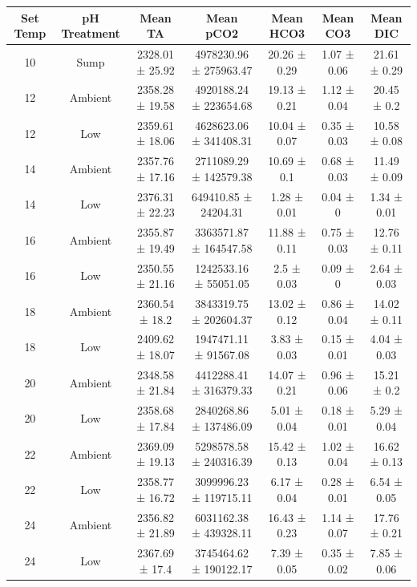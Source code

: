 \documentclass[
]{article}
\begin{document}
\begin{table}[!ht]
    \centering
    \begin{tabular}{|c|c|c|c|c|c|c|}
    \hline
        \textbf{Set Temp} & \textbf{pH Treatment} & \textbf{Mean TA} & \textbf{Mean pCO2} & \textbf{Mean HCO3} & \textbf{Mean CO3} & \textbf{Mean DIC} \\ \hline
        10 & Sump & 2328.01 ± 25.92 & 4978230.96 ± 275963.47 & 20.26 ± 0.29 & 1.07 ± 0.06 & 21.61 ± 0.29 \\ \hline
        12 & Ambient & 2358.28 ± 19.58 & 4920188.24 ± 223654.68 & 19.13 ± 0.21 & 1.12 ± 0.04 & 20.45 ± 0.2 \\ \hline
        12 & Low & 2359.61 ± 18.06 & 4628623.06 ± 341408.31 & 10.04 ± 0.07 & 0.35 ± 0.03 & 10.58 ± 0.08 \\ \hline
        14 & Ambient & 2357.76 ± 17.16 & 2711089.29 ± 142579.38 & 10.69 ± 0.1 & 0.68 ± 0.03 & 11.49 ± 0.09 \\ \hline
        14 & Low & 2376.31 ± 22.23 & 649410.85 ± 24204.31 & 1.28 ± 0.01 & 0.04 ± 0 & 1.34 ± 0.01 \\ \hline
        16 & Ambient & 2355.87 ± 19.49 & 3363571.87 ± 164547.58 & 11.88 ± 0.11 & 0.75 ± 0.03 & 12.76 ± 0.11 \\ \hline
        16 & Low & 2350.55 ± 21.16 & 1242533.16 ± 55051.05 & 2.5 ± 0.03 & 0.09 ± 0 & 2.64 ± 0.03 \\ \hline
        18 & Ambient & 2360.54 ± 18.2 & 3843319.75 ± 202604.37 & 13.02 ± 0.12 & 0.86 ± 0.04 & 14.02 ± 0.11 \\ \hline
        18 & Low & 2409.62 ± 18.07 & 1947471.11 ± 91567.08 & 3.83 ± 0.03 & 0.15 ± 0.01 & 4.04 ± 0.03 \\ \hline
        20 & Ambient & 2348.58 ± 21.84 & 4412288.41 ± 316379.33 & 14.07 ± 0.21 & 0.96 ± 0.06 & 15.21 ± 0.2 \\ \hline
        20 & Low & 2358.68 ± 17.84 & 2840268.86 ± 137486.09 & 5.01 ± 0.04 & 0.18 ± 0.01 & 5.29 ± 0.04 \\ \hline
        22 & Ambient & 2369.09 ± 19.13 & 5298578.58 ± 240316.39 & 15.42 ± 0.13 & 1.02 ± 0.04 & 16.62 ± 0.13 \\ \hline
        22 & Low & 2358.77 ± 16.72 & 3099996.23 ± 119715.11 & 6.17 ± 0.04 & 0.28 ± 0.01 & 6.54 ± 0.05 \\ \hline
        24 & Ambient & 2356.82 ± 21.89 & 6031162.38 ± 439328.11 & 16.43 ± 0.23 & 1.14 ± 0.07 & 17.76 ± 0.21 \\ \hline
        24 & Low & 2367.69 ± 17.4 & 3745464.62 ± 190122.17 & 7.39 ± 0.05 & 0.35 ± 0.02 & 7.85 ± 0.06 \\ \hline

\end{tabular}
\end{table}
\end{document}
